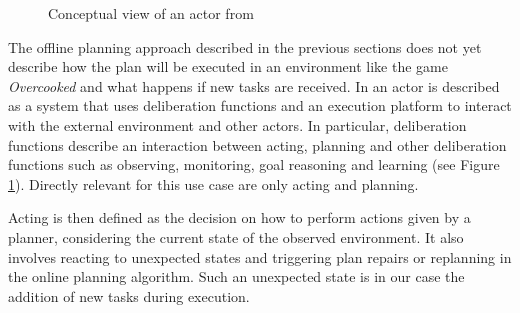 \begin{figure}
  \centering
  \caption[Conceptual view of an actor]{Conceptual view of an actor from \cite{ghallabAutomatedPlanningActing2016}}
  \label{fig:background-acting-conceptual}
\end{figure}

The offline planning approach described in the previous sections does not yet describe how the plan will be executed in an environment like the game \textit{Overcooked} and what happens if new tasks are received.
In \cite{ghallabAutomatedPlanningActing2016} an actor is described as a system that uses deliberation functions and an execution platform to interact with the external environment and other actors.
In particular, deliberation functions describe an interaction between acting, planning and other deliberation functions such as observing, monitoring, goal reasoning and learning \citep{ingrandDeliberationAutonomousRobots2017} (see Figure \ref{fig:background-acting-conceptual}).
Directly relevant for this use case are only acting and planning.




Acting is then defined as the decision on how to perform actions given by a planner, considering the current state of the observed environment.
It also involves reacting to unexpected states and triggering plan repairs or replanning in the online planning algorithm.
Such an unexpected state is in our case the addition of new tasks during execution.

